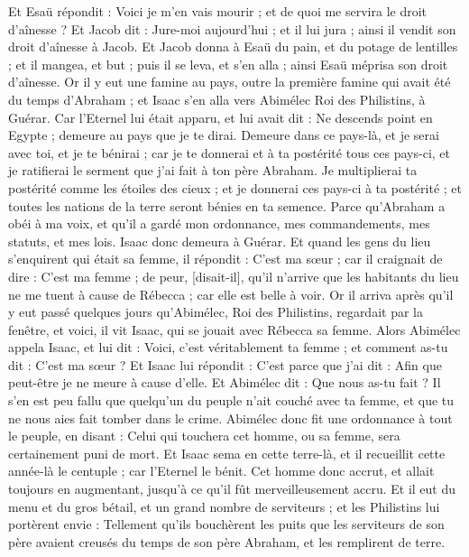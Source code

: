 \begin{multicols}{2}
Et Esaü répondit : Voici je m'en vais mourir ; et de quoi me servira le droit d'aînesse ?
Et Jacob dit : Jure-moi aujourd'hui ; et il lui jura ; ainsi il vendit son droit d'aînesse à Jacob.
Et Jacob donna à Esaü du pain, et du potage de lentilles ; et il mangea, et but ; puis il se leva, et s'en alla ; ainsi Esaü méprisa son droit d'aînesse.
\VerseOne{}Or il y eut une famine au pays, outre la première famine qui avait été du temps d'Abraham ; et Isaac s'en alla vers Abimélec Roi des Philistins, à Guérar.
Car l'Eternel lui était apparu, et lui avait dit : Ne descends point en Egypte ; demeure au pays que je te dirai.
Demeure dans ce pays-là, et je serai avec toi, et je te bénirai ; car je te donnerai et à ta postérité tous ces pays-ci, et je ratifierai le serment que j'ai fait à ton père Abraham.
Je multiplierai ta postérité comme les étoiles des cieux ; et je donnerai ces pays-ci à ta postérité ; et toutes les nations de la terre seront bénies en ta semence.
Parce qu'Abraham a obéi à ma voix, et qu'il a gardé mon ordonnance, mes commandements, mes statuts, et mes lois.
Isaac donc demeura à Guérar.
Et quand les gens du lieu s'enquirent qui était sa femme, il répondit : C'est ma sœur ; car il craignait de dire : C'est ma femme ; de peur, [disait-il], qu'il n'arrive que les habitants du lieu ne me tuent à cause de Rébecca ; car elle est belle à voir.
Or il arriva après qu'il y eut passé quelques jours qu'Abimélec, Roi des Philistins, regardait par la fenêtre, et voici, il vit Isaac, qui se jouait avec Rébecca sa femme.
Alors Abimélec appela Isaac, et lui dit : Voici, c'est véritablement ta femme ; et comment as-tu dit : C'est ma sœur ? Et Isaac lui répondit : C'est parce que j'ai dit : Afin que peut-être je ne meure à cause d'elle.
Et Abimélec dit : Que nous as-tu fait ? Il s'en est peu fallu que quelqu'un du peuple n'ait couché avec ta femme, et que tu ne nous aies fait tomber dans le crime.
Abimélec donc fit une ordonnance à tout le peuple, en disant : Celui qui touchera cet homme, ou sa femme, sera certainement puni de mort.
Et Isaac sema en cette terre-là, et il recueillit cette année-là le centuple ; car l'Eternel le bénit.
Cet homme donc accrut, et allait toujours en augmentant, jusqu'à ce qu'il fût merveilleusement accru.
Et il eut du menu et du gros bétail, et un grand nombre de serviteurs ; et les Philistins lui portèrent envie :
Tellement qu'ils bouchèrent les puits que les serviteurs de son père avaient creusés du temps de son père Abraham, et les remplirent de terre.

\end{multicols}
